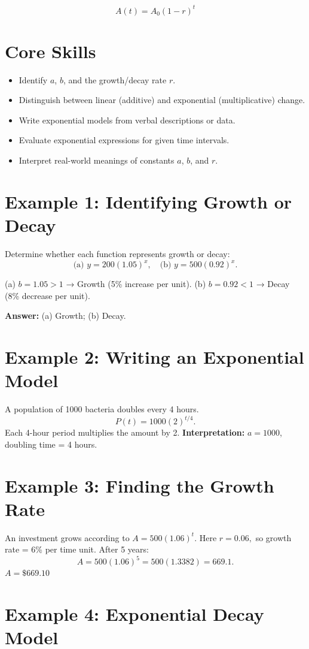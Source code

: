 \documentclass[14pt]{extarticle}
\begin{document}
\[
A(t) = A_0 (1 - r)^t
\]

\section*{Core Skills}
\begin{itemize}
  \item Identify \(a\), \(b\), and the growth/decay rate \(r\).
  \item Distinguish between linear (additive) and exponential (multiplicative) change.
  \item Write exponential models from verbal descriptions or data.
  \item Evaluate exponential expressions for given time intervals.
  \item Interpret real-world meanings of constants \(a\), \(b\), and \(r\).
\end{itemize}

\section*{Example 1: Identifying Growth or Decay}

Determine whether each function represents growth or decay:
\[
\text{(a) } y = 200(1.05)^x, \quad \text{(b) } y = 500(0.92)^x.
\]

(a) \(b = 1.05 > 1\) → Growth (5\% increase per unit).
(b) \(b = 0.92 < 1\) → Decay (8\% decrease per unit).

\textbf{Answer:} (a) Growth; (b) Decay.

\section*{Example 2: Writing an Exponential Model}

A population of 1000 bacteria doubles every 4 hours.  
\[
P(t) = 1000(2)^{t/4}.
\]
Each 4-hour period multiplies the amount by 2.  
\textbf{Interpretation:} \(a = 1000\), doubling time = 4 hours.

\section*{Example 3: Finding the Growth Rate}

An investment grows according to \(A = 500(1.06)^t.\)  
Here \(r = 0.06,\) so growth rate = 6\% per time unit.
After 5 years:
\[
A = 500(1.06)^5 = 500(1.3382) = 669.1.
\]
\(\boxed{A = \$669.10}\)

\section*{Example 4: Exponential Decay Model}
\end{document}
